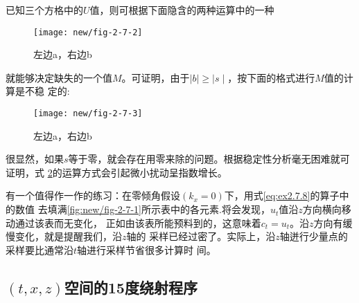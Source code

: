 已知三个方格中的$U$值，则可根据下面隐含的两种运算中的一种
\begin{figure}[H]
\centering
\texttt{[image: new/fig-2-7-2]}
\caption{左边a，右边b}
\label{fig:new/fig-2-7-2}
\end{figure}

就能够决定缺失的一个值$M$。可证明，由于$\mid b \mid \geq \mid s \mid $，按下面的格式进行$M$值的计算是不稳
定的:
\begin{figure}[H]
\centering
\texttt{[image: new/fig-2-7-3]}
\caption{左边a，右边b}
\label{fig:new/fig-2-7-3}
\end{figure}
很显然，如果$s$等于零，就会存在用零来除的问题。根据稳定性分析毫无困难就可证明，式
\ref{fig:new/fig-2-7-3}的运算方式会引起微小扰动呈指数增长。

有一个值得作一作的练习：在零倾角假设$(k_x=0)$下，用式\ref{eq:ex2.7.8}的算子中的数值
去填满\ref{fig:new/fig-2-7-1}所示表中的各元素.将会发现，$u_t$值沿$z$方向横向移动通过该表而无变化，
正如由该表所能预料到的，这意味着$c_t=u_t$。沿$z$方向有缓慢变化，就是提醒我们，沿$z$轴的
采样已经过密了。实际上，沿$z$轴迸行少量点的采样要比通常沿$t$轴进行采样节省很多计算时
间。

\subsection{$(t,x,z)$空间的15度绕射程序}
\label{sec:2.7.2}
